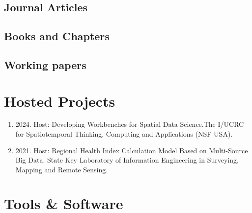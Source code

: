 \documentclass[11pt]{article}
\begin{document}
\subsection*{Journal Articles}
\label{journal-article}
\newrefcontext[labelprefix=J]
\nocite{*}
\printbibliography[type=article, heading=none, resetnumbers=true, keyword=J]

\subsection*{Books and Chapters}
\label{books}
\newrefcontext[labelprefix=B]
\printbibliography[type=book,heading=none,resetnumbers=true,keyword=B]

\subsection*{Working papers}
\label{working-papers}
\newrefcontext[labelprefix=W]
\printbibliography[type=misc,heading=none,resetnumbers=true,keyword=R]

\section*{Hosted Projects}

\begin{enumerate}
	\item 2024. Host: Developing Workbenches for Spatial Data Science.The I/UCRC for Spatiotemporal Thinking, Computing and Applications (NSF USA).
	\item 2021. Host: Regional Health Index Calculation Model Based on Multi-Source Big Data. State Key Laboratory of Information Engineering in Surveying, Mapping and Remote Sensing.
\end{enumerate}

\section*{Tools \& Software}
\label{tools}
\end{document}
